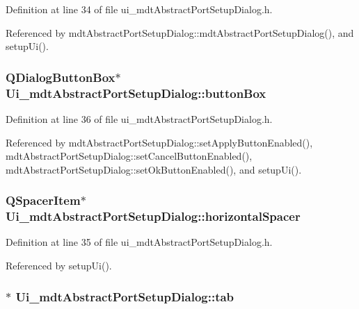 Definition at line 34 of file ui\-\_\-mdt\-Abstract\-Port\-Setup\-Dialog.\-h.



Referenced by mdt\-Abstract\-Port\-Setup\-Dialog\-::mdt\-Abstract\-Port\-Setup\-Dialog(), and setup\-Ui().

\hypertarget{class_ui__mdt_abstract_port_setup_dialog_a2bea54262494fb607a2593ce826df146}{
\subsubsection[{button\-Box}]{\setlength{\rightskip}{0pt plus 5cm}Q\-Dialog\-Button\-Box$\ast$ Ui\-\_\-mdt\-Abstract\-Port\-Setup\-Dialog\-::button\-Box}}\label{class_ui__mdt_abstract_port_setup_dialog_a2bea54262494fb607a2593ce826df146}


Definition at line 36 of file ui\-\_\-mdt\-Abstract\-Port\-Setup\-Dialog.\-h.



Referenced by mdt\-Abstract\-Port\-Setup\-Dialog\-::set\-Apply\-Button\-Enabled(), mdt\-Abstract\-Port\-Setup\-Dialog\-::set\-Cancel\-Button\-Enabled(), mdt\-Abstract\-Port\-Setup\-Dialog\-::set\-Ok\-Button\-Enabled(), and setup\-Ui().

\hypertarget{class_ui__mdt_abstract_port_setup_dialog_aed3bc5d4d007d0646bc95c7a07328b85}{
\subsubsection[{horizontal\-Spacer}]{\setlength{\rightskip}{0pt plus 5cm}Q\-Spacer\-Item$\ast$ Ui\-\_\-mdt\-Abstract\-Port\-Setup\-Dialog\-::horizontal\-Spacer}}\label{class_ui__mdt_abstract_port_setup_dialog_aed3bc5d4d007d0646bc95c7a07328b85}


Definition at line 35 of file ui\-\_\-mdt\-Abstract\-Port\-Setup\-Dialog.\-h.



Referenced by setup\-Ui().

\hypertarget{class_ui__mdt_abstract_port_setup_dialog_a5c47790e1dd3789176f6967f60eb49b8}{
\subsubsection[{tab}]{$\ast$ Ui\-\_\-mdt\-Abstract\-Port\-Setup\-Dialog\-::tab}}\label{class_ui__mdt_abstract_port_setup_dialog_a5c47790e1dd3789176f6967f60eb49b8}


